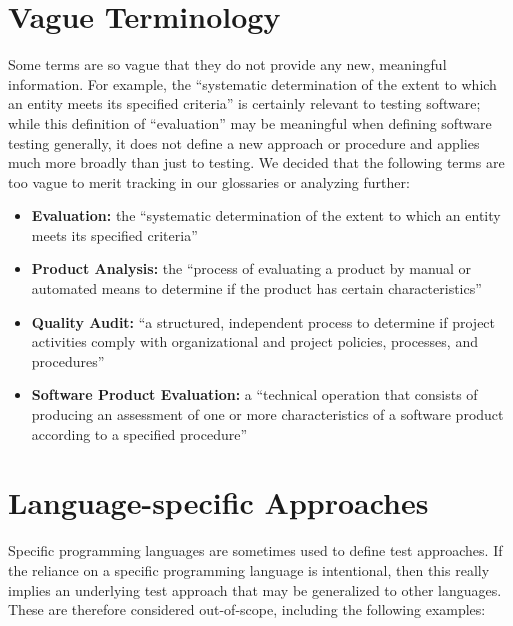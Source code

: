 \section{Vague Terminology}\label{vague-terms}

Some terms are so vague that they do not provide any new, meaningful
information. For example, the ``systematic determination of the extent to
which an entity meets its specified criteria'' \citep[p.~167]{IEEE2017} is
certainly relevant to testing software; while this definition of
``evaluation'' may be meaningful when defining software testing generally,
it does not define a new approach or procedure and applies much more
broadly than just to testing. We decided that the
following terms are too vague to merit tracking in our glossaries or
analyzing further:
\begin{itemize}
    \item \textbf{Evaluation:} the ``systematic determination of the extent
          to which an entity meets its specified criteria''
          \citep[p.~167]{IEEE2017}
    \item \textbf{Product Analysis:} the ``process of evaluating a product by
          manual or automated means to determine if the product has certain
          characteristics'' \citep[p.~343]{IEEE2017}
    \item \textbf{Quality Audit:} ``a structured, independent process to
          determine if project activities comply with organizational and
          project policies, processes, and procedures'' \citep[p.~361]{IEEE2017}
    \item \textbf{Software Product Evaluation:} a ``technical operation that
          consists of producing an assessment of one or more characteristics
          of a software product according to a specified procedure''
          \citep[p.~424]{IEEE2017}
\end{itemize}

\section{Language-specific Approaches}\label{lang-test}
Specific programming languages are sometimes used to define test approaches.
If the reliance on a specific programming language is intentional, then
this really implies an underlying test approach that may be generalized to
other languages. These are therefore considered out-of-scope,
including the following examples:

